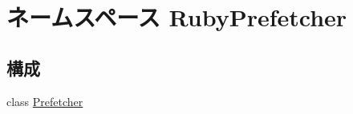 \hypertarget{namespaceRubyPrefetcher}{
\section{ネームスペース RubyPrefetcher}
\label{namespaceRubyPrefetcher}
}
\subsection*{構成}
\begin{DoxyCompactItemize}
\item 
class \hyperlink{classRubyPrefetcher_1_1Prefetcher}{Prefetcher}
\end{DoxyCompactItemize}
